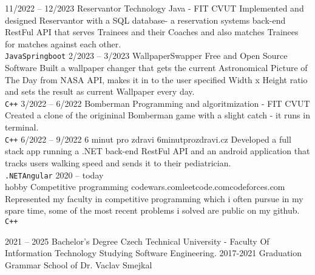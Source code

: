 \documentclass[9pt]{developercv} %
\begin{document}
\begin{entrylist}
	\entry
		{11/2022 -- 12/2023}
		{Reservantor}
		{Technology Java - FIT CVUT}
		{Implemented and designed Reservantor with a SQL database- a reservation systems back-end RestFul API that serves Trainees and their Coaches and also matches Trainees for matches against each other.\\ \texttt{Java}\slashsep\texttt{Springboot}}
	\entry
		{2/2023 -- 3/2023}
		{WallpaperSwapper}
		{Free and Open Source Software}
		{Built a wallpaper changer that gets the current Astronomical Picture of The Day from NASA API, makes it in to the user specified Width x Height ratio and sets the result as current Wallpaper every day.\\ \texttt{C++}}
	\entry
		{3/2022 -- 6/2022}
		{Bomberman}
		{Programming and algoritmization - FIT CVUT}
		{Created a clone of the origininal Bomberman game with a slight catch - it runs in terminal.\\ \texttt{C++}}
	\entry
		{6/2022 -- 9/2022}
		{6 minut pro zdravi}
		{6minutprozdravi.cz}
		{Developed a full stack app running a .NET back-end RestFul API and an android application that tracks users walking speed and sends it to their pediatrician.\\ \texttt{.NET}\slashsep\texttt{Angular}}
	\entry
		{2020 -- today\\\footnotesize{hobby}}
		{Competitive programming}
		{codewars.com\slashsep leetcode.com\slashsep codeforces.com}
		{Represented my faculty in competitive programming which i often pursue in my spare time, some of the most recent problems i solved are public on my github. \\ \texttt{C++}}
\end{entrylist}



\begin{entrylist}
	\entry
		{2021 -- 2025}
		{Bachelor's Degree}
		{Czech Technical University - Faculty Of Intformation Technology}
		{Studying Software Engineering.}
	\entry
		{2017-2021}
		{Graduation}
		{Grammar School of Dr. Vaclav Smejkal}
		{}
\end{entrylist}

\end{document}
